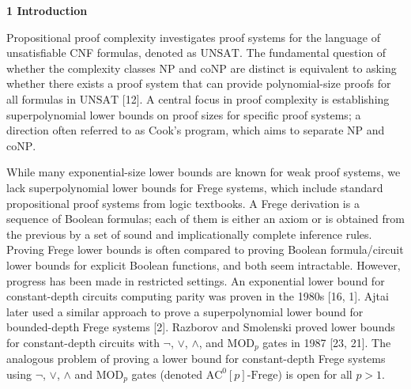 
\par\medskip\noindent\textbf{
1 Introduction}\par


Propositional proof complexity investigates proof systems for the language of unsatisfiable CNF formulas, denoted as $\mathrm{UNSAT}$. The fundamental question of whether the complexity classes $\mathrm{NP}$ and $\mathrm{coNP}$ are distinct is equivalent to asking whether there exists a proof system that can provide polynomial-size proofs for all formulas in $\mathrm{UNSAT}$ [12]. A central focus in proof complexity is establishing superpolynomial lower bounds on proof sizes for specific proof systems; a direction often referred to as Cook’s program, which aims to separate $\mathrm{NP}$ and $\mathrm{coNP}$.\par



While many exponential-size lower bounds are known for weak proof systems, we lack superpolynomial lower bounds for Frege systems, which include standard propositional proof systems from logic textbooks. A Frege derivation is a sequence of Boolean formulas; each of them is either an axiom or is obtained from the previous by a set of sound and implicationally complete inference rules. Proving Frege lower bounds is often compared to proving Boolean formula/circuit lower bounds for explicit Boolean functions, and both seem intractable. However, progress has been made in restricted settings. An exponential lower bound for constant-depth circuits computing parity was proven in the 1980s [16, 1]. Ajtai later used a similar approach to prove a superpolynomial lower bound for bounded-depth Frege systems [2]. Razborov and Smolenski proved lower bounds for constant-depth circuits with $\lnot$, $\lor$, $\land$, and $\mathrm{MOD}_{p}$ gates in 1987 [23, 21].
The analogous problem of proving a lower bound for constant-depth Frege systems using $\lnot$, $\lor$, $\land$ and $\mathrm{MOD}_{p}$ gates (denoted $\mathrm{AC}^{0}[p]\text{-}\mathrm{Frege}$) is open for all $p>1$.\par



